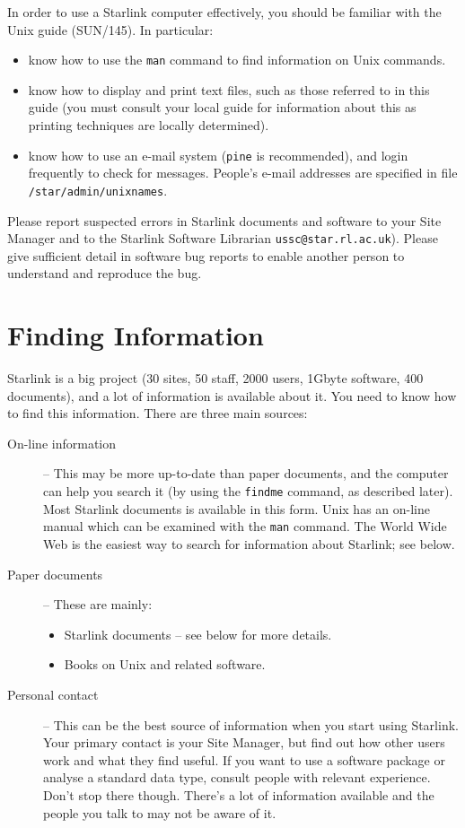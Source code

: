 \documentclass[twoside]{article}
\newcommand{\xref}[3]{#1}
\begin{document}
In order to use a Starlink computer effectively, you should be familiar
with the Unix guide
(\xref{SUN/145}{sun145}{}).
In particular:

\begin{itemize}
\item know how to use the {\tt man} command to find information on Unix
commands.
\item know how to display and print text files, such as those referred to in
this guide (you must consult your local guide for information about this
as printing techniques are locally determined).
\item know how to use an e-mail system ({\tt pine} is recommended), and login
frequently to check for messages.
People's e-mail addresses are specified in file {\tt /star/admin/unixnames}.
\end{itemize}

Please report suspected errors in Starlink documents and software to your Site
Manager and to the Starlink Software Librarian {\tt ussc@star.rl.ac.uk}).
Please give sufficient detail in software bug reports to enable another person
to understand and reproduce the bug.

\newpage

\section{Finding Information}

Starlink is a big project (30 sites, 50 staff, 2000 users, 1Gbyte software,
400 documents), and a lot of information is available about it.
You need to know how to find this information.
There are three main sources:

\begin{description}

\item [On-line information] --
This may be more up-to-date than paper documents, and the computer can help
you search it (by using the {\tt findme} command, as described later).
Most Starlink documents is available in this form.
Unix has an on-line manual which can be examined with the {\tt man} command.
The World Wide Web is the easiest way to search for information about
Starlink; see below.

\item [Paper documents] --
These are mainly:
\begin{itemize}
\item Starlink documents -- see below for more details.
\item Books on Unix and related software.
\end{itemize}

\item [Personal contact] --
This can be the best source of information when you start using Starlink.
Your primary contact is your Site Manager, but find out how other users work
and what they find useful.
If you want to use a software package or analyse a standard data type,
consult people with relevant experience.
Don't stop there though.
There's a lot of information available and the people you talk to may
not be aware of it.
\end{description}
\end{document}
